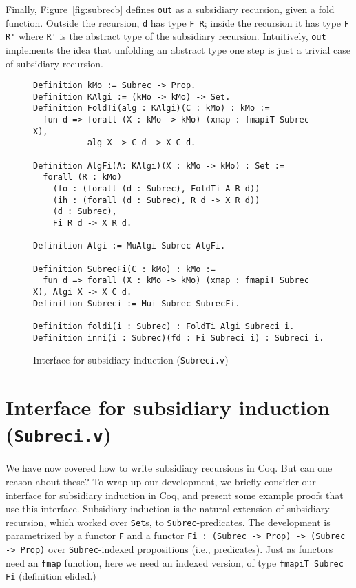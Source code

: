 \documentclass[a4paper,USenglish]{lipics-v2021}
\begin{document}
Finally, Figure~\ref{fig:subrecb} defines \verb|out| as a subsidiary
recursion, given a fold function.
Outside the recursion, \verb|d| has type \verb|F R|; inside the
recursion it has type \verb|F R'| where \verb|R'| is the abstract type
of the subsidiary recursion.  Intuitively, \verb|out| implements the idea that
unfolding an abstract type one step is just a trivial case of
subsidiary recursion.

\begin{figure}
\begin{verbatim}
Definition kMo := Subrec -> Prop.
Definition KAlgi := (kMo -> kMo) -> Set.
Definition FoldTi(alg : KAlgi)(C : kMo) : kMo :=
  fun d => forall (X : kMo -> kMo) (xmap : fmapiT Subrec X),
           alg X -> C d -> X C d.

Definition AlgFi(A: KAlgi)(X : kMo -> kMo) : Set :=
  forall (R : kMo)
    (fo : (forall (d : Subrec), FoldTi A R d))
    (ih : (forall (d : Subrec), R d -> X R d))
    (d : Subrec),
    Fi R d -> X R d.

Definition Algi := MuAlgi Subrec AlgFi.

Definition SubrecFi(C : kMo) : kMo :=
  fun d => forall (X : kMo -> kMo) (xmap : fmapiT Subrec X), Algi X -> X C d.
Definition Subreci := Mui Subrec SubrecFi.

Definition foldi(i : Subrec) : FoldTi Algi Subreci i.
Definition inni(i : Subrec)(fd : Fi Subreci i) : Subreci i.
\end{verbatim}
\caption{Interface for subsidiary induction (\texttt{Subreci.v})}
\label{fig:subreci}
\end{figure}

\section{Interface for subsidiary induction (\texttt{Subreci.v})}
\label{sec:interfacei}

We have now covered how to write subsidiary recursions in Coq.  But can one
reason about these?  To wrap up our development, we briefly consider our
interface for subsidiary induction in Coq, and present some
example proofs that use this interface.  Subsidiary induction is
the natural extension of subsidiary recursion, which worked over
\verb|Set|s, to \verb|Subrec|-predicates.  The development is
parametrized by a functor \verb|F| and a functor
\verb|Fi : (Subrec -> Prop) -> (Subrec -> Prop)| over
\verb|Subrec|-indexed propositions (i.e., predicates).  Just as
functors need an \verb|fmap| function, here we need an indexed
version, of type \verb|fmapiT Subrec Fi| (definition elided.)
\end{document}

